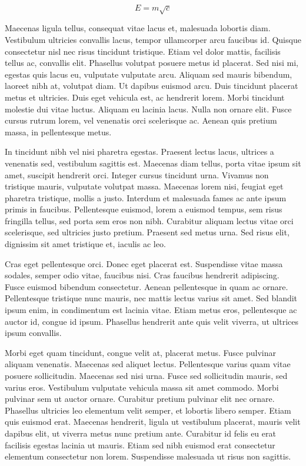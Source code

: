 \documentclass[11pt,a4paper]{memoir}\usepackage[]{graphicx}\usepackage[]{color}
\begin{document}
\begin{equation}
E = m \sqrt{c}
\end{equation}

Maecenas ligula tellus, consequat vitae lacus et, malesuada lobortis diam. Vestibulum ultricies convallis lacus, tempor ullamcorper arcu faucibus id. Quisque consectetur nisl nec risus tincidunt tristique. Etiam vel dolor mattis, facilisis tellus ac, convallis elit. Phasellus volutpat posuere metus id placerat. Sed nisi mi, egestas quis lacus eu, vulputate vulputate arcu. Aliquam sed mauris bibendum, laoreet nibh at, volutpat diam. Ut dapibus euismod arcu. Duis tincidunt placerat metus et ultricies. Duis eget vehicula est, ac hendrerit lorem. Morbi tincidunt molestie dui vitae luctus. Aliquam eu lacinia lacus. Nulla non ornare elit. Fusce cursus rutrum lorem, vel venenatis orci scelerisque ac. Aenean quis pretium massa, in pellentesque metus.

In tincidunt nibh vel nisi pharetra egestas. Praesent lectus lacus, ultrices a venenatis sed, vestibulum sagittis est. Maecenas diam tellus, porta vitae ipsum sit amet, suscipit hendrerit orci. Integer cursus tincidunt urna. Vivamus non tristique mauris, vulputate volutpat massa. Maecenas lorem nisi, feugiat eget pharetra tristique, mollis a justo. Interdum et malesuada fames ac ante ipsum primis in faucibus. Pellentesque euismod, lorem a euismod tempus, sem risus fringilla tellus, sed porta sem eros non nibh. Curabitur aliquam lectus vitae orci scelerisque, sed ultricies justo pretium. Praesent sed metus urna. Sed risus elit, dignissim sit amet tristique et, iaculis ac leo.

Cras eget pellentesque orci. Donec eget placerat est. Suspendisse vitae massa sodales, semper odio vitae, faucibus nisi. Cras faucibus hendrerit adipiscing. Fusce euismod bibendum consectetur. Aenean pellentesque in quam ac ornare. Pellentesque tristique nunc mauris, nec mattis lectus varius sit amet. Sed blandit ipsum enim, in condimentum est lacinia vitae. Etiam metus eros, pellentesque ac auctor id, congue id ipsum. Phasellus hendrerit ante quis velit viverra, ut ultrices ipsum convallis.

Morbi eget quam tincidunt, congue velit at, placerat metus. Fusce pulvinar aliquam venenatis. Maecenas sed aliquet lectus. Pellentesque varius quam vitae posuere sollicitudin. Maecenas sed nisi urna. Fusce sed sollicitudin mauris, sed varius eros. Vestibulum vulputate vehicula massa sit amet commodo. Morbi pulvinar sem ut auctor ornare. Curabitur pretium pulvinar elit nec ornare. Phasellus ultricies leo elementum velit semper, et lobortis libero semper. Etiam quis euismod erat. Maecenas hendrerit, ligula ut vestibulum placerat, mauris velit dapibus elit, ut viverra metus nunc pretium ante. Curabitur id felis eu erat facilisis egestas lacinia ut mauris. Etiam sed nibh euismod erat consectetur elementum consectetur non lorem. Suspendisse malesuada ut risus non sagittis.
\end{document}
